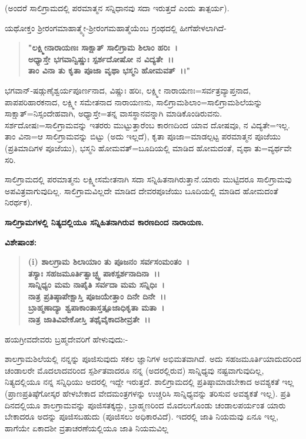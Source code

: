 (ಅಂದರೆ ಸಾಲಿಗ್ರಾಮದಲ್ಲಿ ಪರಮಾತ್ಮನ ಸನ್ನಿಧಾನವು ಸದಾ ಇರುತ್ತದೆ ಎಂದು ತಾತ್ಪರ್ಯ).

ಯಥೋಕ್ತಂ ಶ‍್ರೀರಂಗಮಾಹಾತ್ಮ್ಯೇ-ಶ‍್ರೀರಂಗಮಹಾತ್ಮೆಯೆಂಬ ಗ್ರಂಥದಲ್ಲಿ ಹೀಗೆ\break ಹೇಳಲಾಗಿದೆ-

\begin{verse}
\textbf{"ಲಕ್ಷ್ಮೀನಾರಾಯಣಃ ಸಾಕ್ಷಾತ್ ಸಾಲಿಗ್ರಾಮ ಶಿಲಾಂ ಹರಿಃ~।}\\\textbf{ಅಧ್ಯಾಸ್ತೇ ಭಗವಾನ್ವಿಷ್ಣುಃ ಸ್ಪರ್ಶದೋಷೋ ನ ವಿದ್ಯತೇ~।।}\\\textbf{ತಾಂ ವಿನಾ ತು ಕೃತಾ ಪೂಜಾ ವೃಥಾ ಭಸ್ಮನಿ ಹೋಮವತ್~।।"}
\end{verse}


ಭಗವಾನ್-ಷಡ್ಗುಣೈಶ್ವರ್ಯಪೂರ್ಣನಾದ, ವಿಷ್ಣುಃ ಹರಿಃ, ಲಕ್ಷ್ಮೀ ನಾರಾಯಣಃ=\break ಸರ್ವತ್ರವ್ಯಾಪ್ತನಾದ, ಪಾಪಪರಿಹಾರಕನಾದ, ಲಕ್ಷ್ಮೀ ಸಮೇತನಾದ ನಾರಾಯಣನು, ಸಾಲಿಗ್ರಾಮಶಿಲಾಂ=ಸಾಲಿಗ್ರಾಮಶಿಲೆಯನ್ನು ಸಾಕ್ಷಾತ್=ನಿಸ್ಸಂದೇಹವಾಗಿ, ಅಧ್ಯಾಸ್ತೇ=ತನ್ನ ವಾಸ\-ಸ್ಥಾನವನ್ನಾಗಿ ಮಾಡಿಕೊಂಡಿರುವನು. ಸರ್ಶದೋಷಃ=ಸಾಲಿಗ್ರಾಮವನ್ನು ಇತರರು ಮುಟ್ಟು\-ತ್ತಾರೆಂಬ ಕಾರಣದಿಂದ ಯಾವ ದೋಷವೂ, ನ ವಿದ್ಯತೇ=ಇಲ್ಲ. ತಾಂ ವಿನಾ=ಆ ಸಾಲಿಗ್ರಾಮವನ್ನು ಬಿಟ್ಟು (ಅದು ಇಲ್ಲದೆ), ಕೃತಾ ಪೂಜಾ=ಮಾಡಲ್ಪಟ್ಟ ಪರಮಾತ್ಮನ ಪೂಜೆಯು (ಪ್ರತಿಮಾದಿಗಳ ಪೂಜೆಯು), ಭಸ್ಮನಿ ಹೋಮವತ್=ಬೂದಿಯಲ್ಲಿ ಮಾಡಿದ ಹೋಮದಂತೆ, ವೃಥಾ ತು=ವ್ಯರ್ಥವೇ ಸರಿ.

ಸಾಲಿಗ್ರಾಮದಲ್ಲಿ ಪರಮಾತ್ಮನು ಲಕ್ಷ್ಮೀಸಮೇತನಾಗಿ ಸದಾ ಸನ್ನಿಹಿತನಾಗಿರುತ್ತಾನೆ.\break ಯಾರು ಮುಟ್ಟಿದರೂ ಸಾಲಿಗ್ರಾಮವು ಅಪವಿತ್ರವಾಗುವುದಿಲ್ಲ. ಸಾಲಿಗ್ರಾಮವಿಲ್ಲದೇ ಮಾಡಿದ ದೇವರಪೂಜೆಯು ಬೂದಿಯಲ್ಲಿ ಮಾಡಿದ ಹೋಮದಂತೆ ನಿರರ್ಥಕ).

\begin{center}
\textbf{ಸಾಲಿಗ್ರಾಮಗಳಲ್ಲಿ ನಿತ್ಯದಲ್ಲಿಯೂ ಸನ್ನಿಹಿತನಾಗಿರುವ ಕಾರಣದಿಂದ ನಾರಾಯಣ.}
\end{center}

\noindent
\textbf{ವಿಶೇಷಾಂಶ:\enginline{-}}

\begin{verse}
\textbf{(i) ಶಾಲಗ್ರಾಮ ಶಿಲಾಯಾಂ ತು ಪೂಜನಂ ಸರ್ವಸಂಮಂತಂ~।}\\\textbf{ತಸ್ಯಾಃ ಸಹಜಮೂರ್ತಿತ್ವಾಚ್ಛ್ವ ಪಾಕಸ್ಪರ್ಶನಾದಿನಾ~।।}\\\textbf{ಸಾನ್ನಿಧ್ಯಂ ಮಮ ನಾಪೈತಿ ಸರ್ವದಾ ಮಮ ಸನ್ನಿಧಿಃ~।}\\\textbf{ನಾತ್ರ ಪ್ರತಿಷ್ಠಾಪೇಕ್ಷಾಸ್ತಿ ಪೂಜಯೇತ್ತಾಂ ದಿನೇ ದಿನೇ~।।}\\\textbf{ಬ್ರಾಹ್ಮಣಾದ್ಯಾ ಶ್ವಪಾಕಾಂತಾಸ್ತತ್ಪೂಜಾಧಿಕೃತಾ ಮತಾ~।}\\\textbf{ನಾತ್ರ ಜಾತಿವಿವೇಕೋಸ್ತಿ ತಥೈವೈಕಾದಶೀವ್ರತೇ~।।}
\end{verse}


\noindent
ಹಯಗ್ರೀವದೇವರು ಬ್ರಹ್ಮದೇವರಿಗೆ ಹೇಳುವುದು:-

ಶಾಲಗ್ರಾಮಶಿಲೆಯಲ್ಲಿ ನನ್ನನ್ನು ಪೂಜಿಸುವುದು ಸಕಲ ಜ್ಞಾನಿಗಳ ಅಭಿಮತವಾಗಿದೆ. ಅದು ಸಹಜಮೂರ್ತಿಯಾದುದರಿಂದ ಚಂಡಾಲರೇ ಮೊದಲಾದವರಿಂದ ಸ್ಪರ್ಶಿತವಾದರೂ ನನ್ನ (ಅದರಲ್ಲಿರುವ) ಸಾನ್ನಿಧ್ಯವು ನಷ್ಟವಾಗುವುದಿಲ್ಲ, ನಿತ್ಯದಲ್ಲಿಯೂ ನನ್ನ ಸನ್ನಿಧಿಯು ಅದರಲ್ಲಿ ಇದ್ದೇ ಇರುತ್ತದೆ. ಶಾಲಿಗ್ರಾಮದಲ್ಲಿ ಪ್ರತಿಷ್ಠಾಮಾಡಬೇಕಾದ ಅವಶ್ಯಕತೆ ಇಲ್ಲ (ಪ್ರಾಣಪ್ರತಿಷ್ಠೆಗೋಸ್ಕರ ಹೇಳಬೇಕಾದ ವೇದಮಂತ್ರಗಳನ್ನು ಉಚ್ಚರಿಸಿ ಸಾನ್ನಿಧ್ಯವನ್ನು ತರಿಸುವ ಅವಶ್ಯಕತೆ ಇಲ್ಲ). ಪ್ರತಿ ದಿನದಲ್ಲಿಯೂ ಶಾಲಗ್ರಾಮವನ್ನು ಪೂಜಿಸತಕ್ಕದ್ದು, ಬ್ರಾಹ್ಮಣರಿಂದ ಮೊದಲುಗೊಂಡು ಚಂಡಾಲಪರ್ಯಂತ ಯಾರು ಬೇಕಾದರೂ ಅದನ್ನು ಪೂಜಿಸಬಹುದು (ಪೂಜಿಸಲು ಅಧಿಕಾರವಿದೆ). ಇದರಲ್ಲಿ ಜಾತಿ ನಿಯಮವು ಏನೂ ಇಲ್ಲ, ಹಾಗೆಯೇ ಏಕಾದಶೀ ವ್ರತಾಚರಣೆಯಲ್ಲಿಯೂ ಜಾತಿ ನಿಯಮವಿಲ್ಲ

